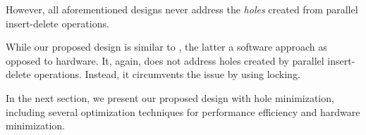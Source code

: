However, all aforementioned designs never address the {\it holes} created from parallel insert-delete operations.

While our proposed design is similar to \cite{pq6}, the latter a software approach as opposed to hardware. It, again, does not address holes created by parallel insert-delete operations. Instead, it circumvents the issue by using locking.

In the next section, we present our proposed design with hole minimization, including several optimization techniques for performance efficiency and hardware minimization.
